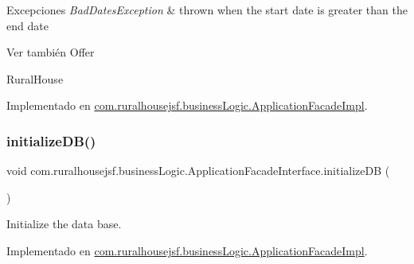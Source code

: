 \begin{DoxyExceptions}{Excepciones}
{\em Bad\+Dates\+Exception} & thrown when the start date is greater than the end date\\
\hline
\end{DoxyExceptions}
\begin{DoxySeeAlso}{Ver también}
Offer 

Rural\+House 
\end{DoxySeeAlso}


Implementado en \mbox{\hyperlink{classcom_1_1ruralhousejsf_1_1business_logic_1_1_application_facade_impl_a178d3964ff871edce1f5a207331319ed}{com.\+ruralhousejsf.\+business\+Logic.\+Application\+Facade\+Impl}}.

\mbox{\label{interfacecom_1_1ruralhousejsf_1_1business_logic_1_1_application_facade_interface_a4670319006cee17060e0c84695d7195f}} 
\subsubsection{\texorpdfstring{initializeDB()}{initializeDB()}}
{\footnotesize\ttfamily void com.\+ruralhousejsf.\+business\+Logic.\+Application\+Facade\+Interface.\+initialize\+DB (\begin{DoxyParamCaption}{ }\end{DoxyParamCaption})}

Initialize the data base. 

Implementado en \mbox{\hyperlink{classcom_1_1ruralhousejsf_1_1business_logic_1_1_application_facade_impl_a1e6cbb70c9568899c86135b3264b431d}{com.\+ruralhousejsf.\+business\+Logic.\+Application\+Facade\+Impl}}.

\mbox{\label{interfacecom_1_1ruralhousejsf_1_1business_logic_1_1_application_facade_interface_a75cc2d20f7df7b8872333cca281bf343}} 
